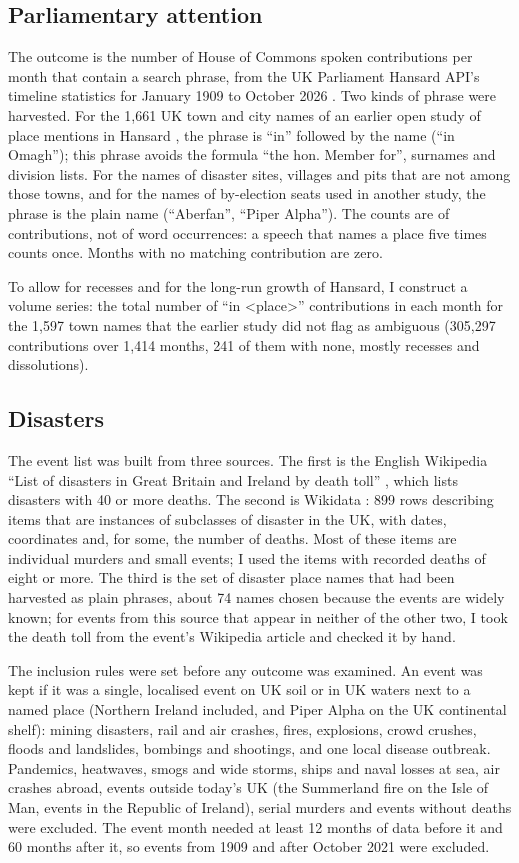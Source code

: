 \documentclass[11pt,a4paper]{article}
\begin{document}
\subsection{Parliamentary attention}
The outcome is the number of House of Commons spoken contributions per month that contain a search phrase, from the UK Parliament Hansard API's timeline statistics for January 1909 to October 2026 \citep{Hansard2026}. Two kinds of phrase were harvested. For the 1,661 UK town and city names of an earlier open study of place mentions in Hansard \citep{Hotham2026}, the phrase is ``in'' followed by the name (``in Omagh''); this phrase avoids the formula ``the hon. Member for'', surnames and division lists. For the names of disaster sites, villages and pits that are not among those towns, and for the names of by-election seats used in another study, the phrase is the plain name (``Aberfan'', ``Piper Alpha''). The counts are of contributions, not of word occurrences: a speech that names a place five times counts once. Months with no matching contribution are zero.

To allow for recesses and for the long-run growth of Hansard, I construct a volume series: the total number of ``in <place>'' contributions in each month for the 1,597 town names that the earlier study did not flag as ambiguous (305,297 contributions over 1,414 months, 241 of them with none, mostly recesses and dissolutions).

\subsection{Disasters}
The event list was built from three sources. The first is the English Wikipedia ``List of disasters in Great Britain and Ireland by death toll'' \citep{Wikipedia2026}, which lists disasters with 40 or more deaths. The second is Wikidata \citep{Vrandecic2014}: 899 rows describing items that are instances of subclasses of disaster in the UK, with dates, coordinates and, for some, the number of deaths. Most of these items are individual murders and small events; I used the items with recorded deaths of eight or more. The third is the set of disaster place names that had been harvested as plain phrases, about 74 names chosen because the events are widely known; for events from this source that appear in neither of the other two, I took the death toll from the event's Wikipedia article and checked it by hand.

The inclusion rules were set before any outcome was examined. An event was kept if it was a single, localised event on UK soil or in UK waters next to a named place (Northern Ireland included, and Piper Alpha on the UK continental shelf): mining disasters, rail and air crashes, fires, explosions, crowd crushes, floods and landslides, bombings and shootings, and one local disease outbreak. Pandemics, heatwaves, smogs and wide storms, ships and naval losses at sea, air crashes abroad, events outside today's UK (the Summerland fire on the Isle of Man, events in the Republic of Ireland), serial murders and events without deaths were excluded. The event month needed at least 12 months of data before it and 60 months after it, so events from 1909 and after October 2021 were excluded.
\end{document}
